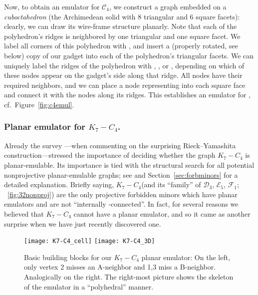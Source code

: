 \documentclass[envcountsect,envcountsame]{llncs}
\renewenvironment{accumulate}{}{}
\newcommand{\KK}{\ensuremath{{K}_7 - C_4}\xspace}
\newcommand{\DD}{\ensuremath{\mathcal{D}_3}\xspace}
\newcommand{\EEE}{\ensuremath{\mathcal{E}_5}\xspace}
\newcommand{\FF}{\ensuremath{\mathcal{F}_1}\xspace}
\newcommand{\CC}{\ensuremath{\mathcal{C}_4}\xspace}
\begin{document}
\begin{accumulate}
Now, to obtain an emulator for \CC, we construct a graph embedded on a 
\emph{cuboctahedron} (the Archimedean solid with 8 triangular and 6 square 
facets): clearly, we can draw its wire-frame structure planarly.
Note that each of the polyhedron's ridges is neighbored by one triangular and 
one square facet.
We label all corners of this polyhedron with , and insert a (properly rotated, 
see below) copy of our gadget into each of the polyhedron's triangular facets. 
We can uniquely label the ridges of the polyhedron with , , or , depending
on which of these nodes appear on the gadget's side along that ridge. All nodes  have their required neighbors, and we can place a node representing  into each square face and
connect it with the nodes along its ridges. This establishes an emulator for ,
cf.\ Figure~\ref{fig:c4emul}.

\end{accumulate}



\subsubsection*{Planar emulator for \KK.}

Already the survey \cite{cit:20years}---when commenting on the surprising
Rieck--Yamashita construction---stressed the importance of deciding
whether the graph \KK is planar-emulable.
Its importance is tied with the structural search for all potential
nonprojective planar-emulable graphs;
see \cite{cit:counterex,cit:martinbc} and Section~\ref{sec:forbminors} for
a detailed explanation.
Briefly saying, \KK (and its ``family'' of \DD, \EEE, \FF;
\figurename~\ref{fig:32nonproj}) are the only projective forbidden minors 
which have planar emulators and are not ``internally -connected''.
In fact, for several reasons we believed that \KK cannot have a planar emulator,
and so it came as another surprise when we have just recently discovered
one.

\begin{figure}[tb] \centering
\vspace{-3mm}
\texttt{[image: K7-C4\_cell]}
 \qquad\qquad
\texttt{[image: K7-C4\_3D]}
\caption{Basic building blocks for our \KK planar emulator:
	On the left, only vertex 2 misses an A-neighbor and 1,3 miss a  B-neighbor.
	Analogically on the right. The right-most picture shows the skeleton of the emulator in 
	a ``polyhedral'' manner.}
\label{fig:K7-C4_cells}
\end{figure}
\end{document}
